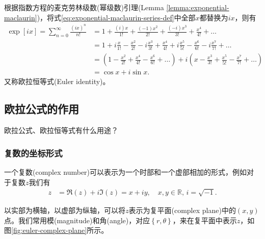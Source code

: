 \begin{subappendices}
\begin{lemma}[欧拉恒等式]
  \label{sec:euler-complex-identity}
  根据指数方程的麦克劳林级数(幂级数)引理(Lemma \ref{lemma:exponential-maclaurin})，将式\eqref{eq:exponential-maclaurin-series-def}中全部$x$都替换为$i x$，则有
  \begin{equation}
    \label{eq:euler-complex-identity}
    \begin{split}
      \exp \left[ i x \right] = \sum_{n=0}^{\infty} \frac{\left( i x \right)^{n}}{n!}
      & = 1 + \frac{\left( i \right) x}{1!}
      + \frac{\left( -1 \right) x^{2}}{2!}
      + \frac{\left( -i \right) x^{3}}{3!}
      + \frac{ x^{4}}{4!}
      + \ldots \\
      & = 1 + i \frac{x}{1!} - \frac{x^{2}}{2!}
      - i  \frac{x^{3}}{3!}
      + \frac{x^{4}}{4!}
      + i \frac{x^{5}}{5!}
      - \frac{x^{6}}{6!}
      - i \frac{x^{7}}{7!}
      + \ldots \\
      & =
      \left(
      1 - \frac{x^{2}}{2!} + \frac{x^{4}}{4!} - \frac{x^{6}}{6!} + \ldots
      \right)
      + i \left(
      x - \frac{x^{3}}{3!} + \frac{x^{5}}{5!} - \frac{x^{7}}{7!} + \ldots
      \right) \\
      & = \cos x + i \sin x.
    \end{split}
  \end{equation}
  又称欧拉恒等式(Euler identity)。
\end{lemma}

\subsection{欧拉公式的作用}
\label{sec:euler-complex-uses}

欧拉公式、欧拉恒等式有什么用途？

\subsubsection{复数的坐标形式}
\label{sec:euler-coordinates}
一个复数(complex number)可以表示为一个时部和一个虚部相加的形式，例如对于复数$z$我们有
\begin{equation*}
\begin{split}
    z & = \Re(z) + i \Im(z) = x + i y, \quad x,y \in \mathbb{R}, \, i = \sqrt{-1}.
\end{split}
\end{equation*}

以实部为横轴，以虚部为纵轴，可以将$z$表示为复平面(complex plane)中的$(x,y)$点。我们常用模(magnitude)和角(angle)，对应$\left\{ r, \theta \right\}$，来在复平面中表示$z$，如图\eqref{fig:euler-complex-plane}所示。


\end{subappendices}

